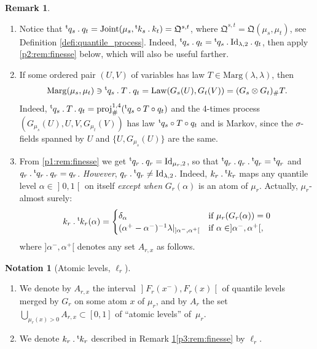 \documentclass[11pt]{article}
\newcommand{\skpt}{\smallskip}
\newcommand{\ldot}{\mathbin{.}}
\theoremstyle{plain}
\theoremstyle{definition}
\newtheorem{notation}[them]{Notation} %
\newtheorem{rem}[them]{Remark}
\newcommand{\id}{\mathrm{Id}}
\newcommand{\join}{\mathrm{Joint}}
\newcommand{\como}{\mathfrak{Q}}
\newcommand{\trans}{{}^{\mathrm{t}}\mkern-1mu}
\newcommand{\la}{\lambda}
\newcommand{\ma}{\mathrm{Marg}}
\newcommand{\law}{\operatorname{Law}}
\newcommand{\pr}{\operatorname{proj}}
\newcommand{\op}{\mathopen}
\newcommand{\clo}{\mathclose}
\begin{document}
\skpt
\begin{rem}\label{rem:finesse}
\begin{enumerate}
\item
\label{p1:rem:finesse} Notice that $\trans{q}_s \ldot q_t=\join(\mu_s,\trans{k}_s \ldot k_t)=\como^{s,t}$, where $\como^{s,t}=\como(\mu_s,\mu_t)$, see Definition \ref{defi:quantile_process}. Indeed, $\trans{q}_s \ldot q_t=\trans{q}_s \ldot\id_{\la,2}{}\ldot q_t$, then apply \eqref{p2:rem:finesse} below,
which will also be useful farther.

\item
\label{p2:rem:finesse} If some ordered pair $(U,V)$ of variables has law $T\in \ma(\la,\la)$, then\vspace*{-3pt}
\[
\ma(\mu_s,\mu_t)\ni\trans{q}_s \ldot T\ldot q_t=\law(G_s(U),G_t(V))=(G_s\otimes G_t)_\#T.
\]
Indeed, $\trans{q}_s \ldot T\ldot q_t=\pr^{1,4}_\#(\trans{q}_s \circ T\circ q_t)$ and the 4-times process $(G_{\mu_s}(U),U,V,G_{\mu_t}(V))$ has law $\trans{q}_s \circ T\circ q_t$ and is Markov, since the $\sigma$-fields spanned by $U$ and $\{U,G_{\mu_s}(U)\}$ are the same.

\item
\label{p3:rem:finesse} From \eqref{p1:rem:finesse} we get $\trans q_r\ldot q_r=\id_{\mu_r,2}$, so that $\trans q_r\ldot q_r\ldot\trans q_r=\trans q_r$ and $q_r\ldot\trans q_r\ldot q_r=q_r$. \emph{However}, $q_r\ldot\trans q_r\neq \id_{\la,2}$. Indeed, $k_r\ldot\trans{k}_r$ maps any quantile level $\alpha\in \op]0,1\clo[$ on itself \emph{except when} $G_r(\alpha)$ is an atom of $\mu_r$. Actually, $\mu_r$-almost surely:\vspace*{-3pt}
\begin{align*}
k_r\ldot\trans{k}_r(\alpha)=
\begin{cases}
\delta_\alpha&\text{if }\mu_r(G_{r}(\alpha))=0\\
(\alpha^+-\alpha^-)^{-1}\la|_{]\alpha^-,\alpha^+[}&\text{if }\alpha\in]\alpha^-,\alpha^+[,
\end{cases}
\end{align*}
where $]\alpha^-,\alpha^+[$ denotes any set $A_{r,x}$ as follows.
\end{enumerate}
\end{rem}

\skpt
\begin{notation}[Atomic levels, $\ell_r$]\label{nota:Asx}
\begin{enumerate}
\item
\label{p:Asx} We denote by $A_{r,x}$ the interval $\op]F_r(x^-),F_r(x)\clo[$ of quantile levels merged by $G_r$ on some atom $x$ of $\mu_r$, and by $A_r$ the set $\bigcup_{\mu_r(x)>0}A_{r,x}\!\subset\! [0,1]$ of ``atomic levels'' of~$\mu_r$.

\item
\label{p:l_R_fini} We denote $k_r\ldot\trans{k}_r$ described in Remark \ref{rem:finesse}\eqref{p3:rem:finesse} by $\ell_r$.
\end{enumerate}
\end{notation}
\end{document}
